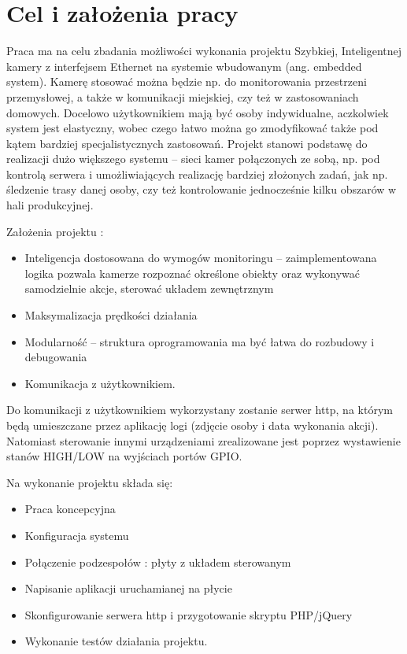 
\chapter{Cel i założenia pracy} %


 
Praca ma na celu zbadania możliwości wykonania projektu Szybkiej, Inteligentnej kamery z interfejsem Ethernet na systemie wbudowanym (ang. embedded system).
Kamerę stosować można będzie np. do monitorowania przestrzeni przemysłowej, a także w komunikacji miejskiej, czy też w zastosowaniach domowych. Docelowo użytkownikiem mają być osoby indywidualne, aczkolwiek system jest elastyczny, wobec czego łatwo można go zmodyfikować także pod kątem bardziej specjalistycznych zastosowań.
Projekt stanowi podstawę do realizacji dużo większego systemu – sieci kamer połączonych ze sobą, np. pod kontrolą serwera i umożliwiających realizację bardziej złożonych zadań, jak np. śledzenie trasy danej osoby, czy też kontrolowanie jednocześnie kilku obszarów w hali produkcyjnej.

\begin{description}
\item Założenia projektu :
	\begin{itemize}[noitemsep]
	\item Inteligencja dostosowana do wymogów monitoringu – zaimplementowana logika pozwala kamerze rozpoznać określone obiekty oraz wykonywać samodzielnie akcje, sterować układem zewnętrznym
	\item Maksymalizacja prędkości działania
\item Modularność – struktura oprogramowania ma być łatwa do rozbudowy i debugowania
\item Komunikacja z użytkownikiem.
		\end{itemize}
\end{description}

Do komunikacji z użytkownikiem wykorzystany zostanie serwer http, na którym będą umieszczane przez aplikację logi (zdjęcie osoby i data wykonania akcji). Natomiast sterowanie innymi urządzeniami zrealizowane jest poprzez wystawienie stanów HIGH/LOW na wyjściach portów GPIO.

\begin{description}
\item Na wykonanie projektu składa się:
\begin{itemize}[noitemsep]
\item Praca koncepcyjna
\item Konfiguracja systemu 
\item Połączenie podzespołów : płyty z układem sterowanym
\item Napisanie aplikacji uruchamianej na płycie
\item Skonfigurowanie serwera http i przygotowanie skryptu PHP/jQuery
\item Wykonanie testów działania projektu.
\end{itemize}
\end{description}